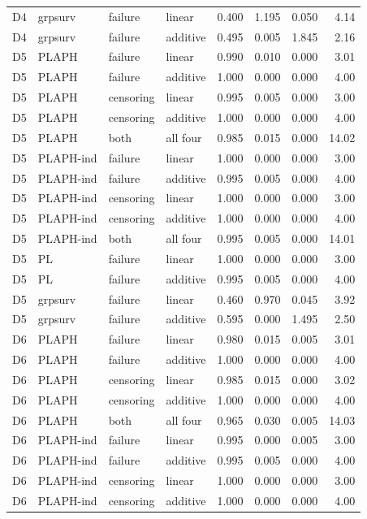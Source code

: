 \begin{longtable}{clllrrrr}
D4 & grpsurv & failure & linear & 0.400 & 1.195 & 0.050 & 4.14 \\
D4 & grpsurv & failure & additive & 0.495 & 0.005 & 1.845 & 2.16 \\
D5 & PLAPH & failure & linear & 0.990 & 0.010 & 0.000 & 3.01 \\
D5 & PLAPH & failure & additive & 1.000 & 0.000 & 0.000 & 4.00 \\
D5 & PLAPH & censoring & linear & 0.995 & 0.005 & 0.000 & 3.00 \\
D5 & PLAPH & censoring & additive & 1.000 & 0.000 & 0.000 & 4.00 \\
D5 & PLAPH & both & all four & 0.985 & 0.015 & 0.000 & 14.02 \\
D5 & PLAPH-ind & failure & linear & 1.000 & 0.000 & 0.000 & 3.00 \\
D5 & PLAPH-ind & failure & additive & 0.995 & 0.005 & 0.000 & 4.00 \\
D5 & PLAPH-ind & censoring & linear & 1.000 & 0.000 & 0.000 & 3.00 \\
D5 & PLAPH-ind & censoring & additive & 1.000 & 0.000 & 0.000 & 4.00 \\
D5 & PLAPH-ind & both & all four & 0.995 & 0.005 & 0.000 & 14.01 \\
D5 & PL & failure & linear & 1.000 & 0.000 & 0.000 & 3.00 \\
D5 & PL & failure & additive & 0.995 & 0.005 & 0.000 & 4.00 \\
D5 & grpsurv & failure & linear & 0.460 & 0.970 & 0.045 & 3.92 \\
D5 & grpsurv & failure & additive & 0.595 & 0.000 & 1.495 & 2.50 \\
D6 & PLAPH & failure & linear & 0.980 & 0.015 & 0.005 & 3.01 \\
D6 & PLAPH & failure & additive & 1.000 & 0.000 & 0.000 & 4.00 \\
D6 & PLAPH & censoring & linear & 0.985 & 0.015 & 0.000 & 3.02 \\
D6 & PLAPH & censoring & additive & 1.000 & 0.000 & 0.000 & 4.00 \\
D6 & PLAPH & both & all four & 0.965 & 0.030 & 0.005 & 14.03 \\
D6 & PLAPH-ind & failure & linear & 0.995 & 0.000 & 0.005 & 3.00 \\
D6 & PLAPH-ind & failure & additive & 0.995 & 0.005 & 0.000 & 4.00 \\
D6 & PLAPH-ind & censoring & linear & 1.000 & 0.000 & 0.000 & 3.00 \\
D6 & PLAPH-ind & censoring & additive & 1.000 & 0.000 & 0.000 & 4.00 \\

\end{longtable}
